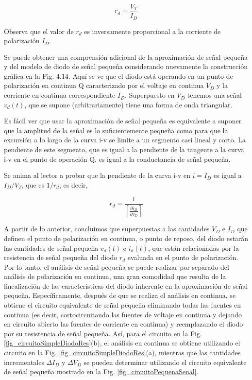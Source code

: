 \begin{equation*}
r_d = \frac{V_T}{I_D}
\end{equation*}

 Observa que el valor de \( r_d \) es inversamente proporcional a la corriente de polarización \( I_D \).

Se puede obtener una comprensión adicional de la aproximación de señal pequeña y del modelo de diodo de señal pequeña considerando nuevamente la construcción gráfica en la Fig. 4.14. Aquí se ve que el diodo está operando en un punto de polarización en continua Q caracterizado por el voltaje en continua \( V_D \) y la corriente en continua correspondiente \( I_D \). Superpuesto en \( V_D \) tenemos una señal \( v_d(t) \), que se supone (arbitrariamente) tiene una forma de onda triangular.

Es fácil ver que usar la aproximación de señal pequeña es equivalente a suponer que la amplitud de la señal es lo suficientemente pequeña como para que la excursión a lo largo de la curva i-v se limite a un segmento casi lineal y corto. La pendiente de este segmento, que es igual a la pendiente de la tangente a la curva i-v en el punto de operación Q, es igual a la conductancia de señal pequeña.

Se anima al lector a probar que la pendiente de la curva i-v en \( i = I_D \) es igual a \( I_D / V_T \), que es \( 1 / r_d \); es decir,

\begin{equation*}
r_d = \frac{1}{\left[ \frac{\partial i_D}{\partial v_D} \right]}
\end{equation*}

A partir de lo anterior, concluimos que superpuestas a las cantidades \( V_D \) e \( I_D \) que definen el punto de polarización en continua, o punto de reposo, del diodo estarán las cantidades de señal pequeña \( v_d(t) \) e \( i_d(t) \), que están relacionadas por la resistencia de señal pequeña del diodo \( r_d \) evaluada en el punto de polarización. Por lo tanto, el análisis de señal pequeña se puede realizar por separado del análisis de polarización en continua, una gran comodidad que resulta de la linealización de las características del diodo inherente en la aproximación de señal pequeña. Específicamente, después de que se realiza el análisis en continua, se obtiene el circuito equivalente de señal pequeña eliminando todas las fuentes en continua (es decir, cortocircuitando las fuentes de voltaje en continua y dejando en circuito abierto las fuentes de corriente en continua) y reemplazando el diodo por su resistencia de señal pequeña. Así, para el circuito en la Fig. \ref{fig_circuitoSimpleDiodoRes}(b), el análisis en continua se obtiene utilizando el circuito en la Fig. \ref{fig_circuitoSimpleDiodoRes}(a), mientras que las cantidades incrementales \( \Delta I_D \) y \( \Delta V_D \) se pueden determinar utilizando el circuito equivalente de señal pequeña mostrado en la Fig. \ref{fig_circuitoPequenaSenal}.


